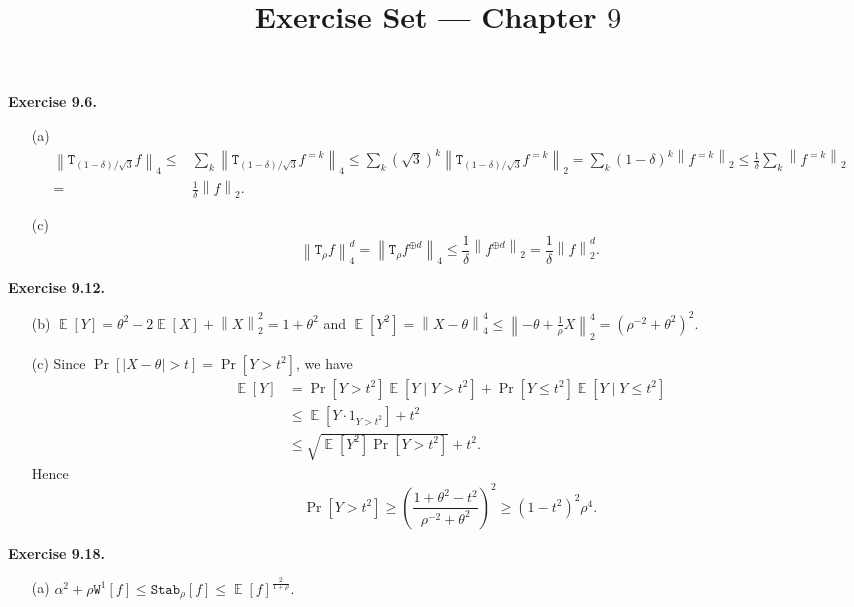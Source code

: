 \documentclass[a4paper]{article}
\title{Exercise Set --- Chapter $9$}
\date{}
\newenvironment{exercise}[1]{
	\par
	\noindent\textbf{Exercise #1.}\quad
}{
	\par
	\bigskip
}
\DeclareMathOperator*{\E}{\mathbb E}
\newcommand{\abs}[1]{{\left| #1 \right|}}
\newcommand{\vabs}[1]{{\left\| #1 \right\|}}
\newcommand{\pbra}[1]{{\left( #1 \right)}}
\newcommand{\sbra}[1]{{\left[ #1 \right]}}
\newcommand{\Wtt}{\mathtt{W}}
\newcommand{\Ttt}{\mathtt{T}}
\newcommand{\Stab}{\mathtt{Stab}}
\begin{document}
\maketitle

\begin{exercise}{9.6}
    \begin{itemize}
        \item[(a)]
            \begin{align*}
            \vabs{\Ttt_{(1-\delta)/\sqrt 3}f}_4
                \leq&\sum_k\vabs{\Ttt_{(1-\delta)/\sqrt 3}f^{=k}}_4\leq
            \sum_k(\sqrt 3)^k\vabs{\Ttt_{(1-\delta)/\sqrt 3}f^{=k}}_2=
            \sum_k(1-\delta)^k\vabs{f^{=k}}_2\leq
            \frac1\delta\sum_k\vabs{f^{=k}}_2\\
                =&\frac1\delta\vabs{f}_2.
            \end{align*}
        \item[(c)]
            $$
            \vabs{\Ttt_\rho f}_4^d=\vabs{\Ttt_\rho f^{\oplus d}}_4\leq\frac1\delta\vabs{f^{\oplus d}}_2=\frac1\delta\vabs{f}_2^d.
            $$
    \end{itemize}
\end{exercise}

\begin{exercise}{9.12}
    \begin{itemize}
        \item[(b)] $\E[Y]=\theta^2-2\E[X]+\vabs{X}_2^2=1+\theta^2$ and 
            $\E[Y^2]=\vabs{X-\theta}_4^4\leq\vabs{-\theta+\frac1\rho X}_2^4=\pbra{\rho^{-2}+\theta^2}^2$.
        \item[(c)] Since $\Pr\sbra{\abs{X-\theta}>t}=\Pr\sbra{Y>t^2}$, we have
            \begin{align*}
                \E[Y]&=\Pr[Y>t^2]\E[Y\mid Y>t^2]+\Pr[Y\leq t^2]\E[Y\mid Y\leq t^2]\\
                &\leq \E\sbra{Y\cdot 1_{Y>t^2}}+t^2\\
                &\leq \sqrt{\E[Y^2]\Pr[Y>t^2]}+t^2.
            \end{align*}
            Hence 
            $$
            \Pr[Y>t^2]\geq\pbra{\frac{1+\theta^2-t^2}{\rho^{-2}+\theta^2}}^2\geq(1-t^2)^2\rho^4.
            $$
    \end{itemize}
\end{exercise}

\begin{exercise}{9.18}
    \begin{itemize}
        \item[(a)] $\alpha^2+\rho\Wtt^1[f]\leq\Stab_\rho[f]\leq\E[f]^{\frac2{1+\rho}}.$
    \end{itemize}
\end{exercise}
\end{document}
